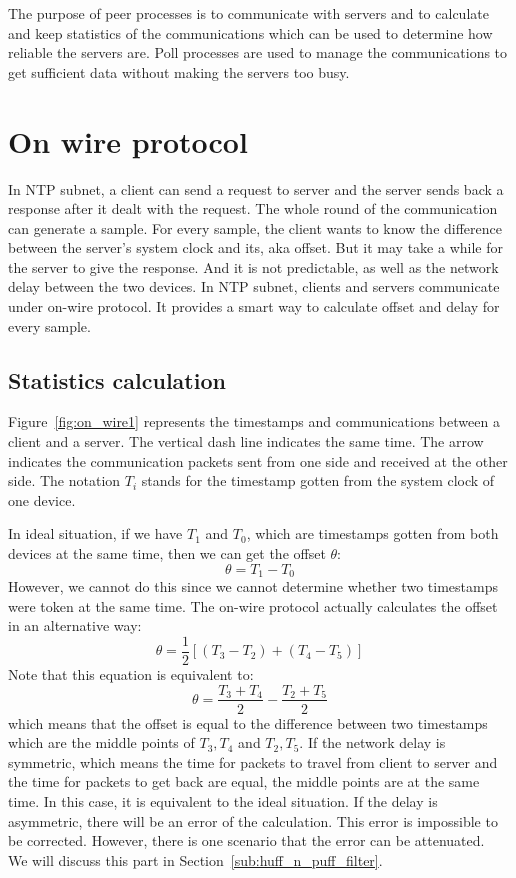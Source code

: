 

The purpose of peer processes is to communicate with servers and to calculate
and keep statistics of the communications which can be used to determine how
reliable the servers are. Poll processes are used to manage the communications
to get sufficient data without making the servers too busy.

\section{On wire protocol}%
\label{sec:on_wire_protocol}
In NTP subnet, a client can send a request to server and the server sends back
a response after it dealt with the request. The whole round of the
communication can generate a sample. For every sample, the client wants to know
the difference between the server's system clock and its, aka offset.  But it
may take a while for the server to give the response. And it is not
predictable, as well as the network delay between the two devices.  In NTP
subnet, clients and servers communicate under on-wire protocol. It provides a
smart way to calculate offset and delay for every sample. 

\subsection{Statistics calculation}%
\label{sub:statistics_calculation}
Figure~\ref{fig:on_wire1} represents the timestamps and communications between
a client and a server. The vertical dash line indicates the same time. The
arrow indicates the communication packets sent from one side and received at
the other side. The notation $T_i$ stands for the timestamp gotten from the
system clock of one device. 



In ideal situation, if we have $T_1$ and $T_0$, which are timestamps gotten
from both devices at the same time, then we can get the offset $\theta$:
$$\theta = T_1 - T_0$$
However, we cannot do this since we cannot determine whether two timestamps
were token at the same time. The on-wire protocol actually calculates the
offset in an alternative way:
\begin{equation}
    \theta = \frac{1}{2}\left[(T_3 - T_2) + (T_4 - T_5)\right]
    \label{eq:offset_def}
\end{equation}
Note that this equation is equivalent to:
$$\theta = \frac{T_3 + T_4}{2} - \frac{T_2 + T_5}{2}$$
which means that the offset is equal to the difference between two timestamps
which are the middle points of $T_3, T_4$ and $T_2, T_5$. 
If the network delay is symmetric, which means the time for packets to travel
from client to server and the time for packets to get back are equal, the
middle points are at the same time. In this case, it is equivalent to the ideal
situation. If the delay is asymmetric, there will be an error of the
calculation. This error is impossible to be corrected. However, there is one
scenario that the error can be attenuated.~\cite{redbook} We will discuss this
part in Section~\ref{sub:huff_n_puff_filter}.

